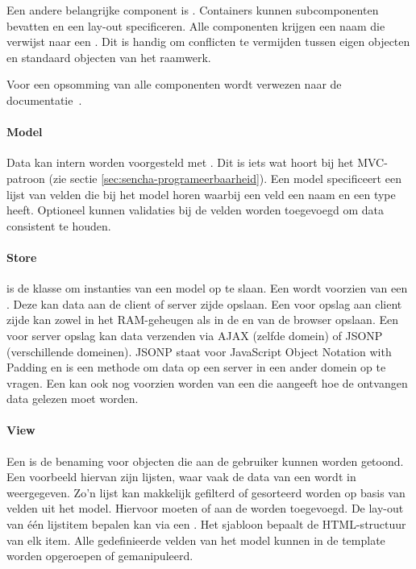Een andere belangrijke component is .  
Containers kunnen subcomponenten bevatten en een lay-out specificeren.  
Alle componenten krijgen een naam die verwijst naar een .  
Dit is handig om conflicten te vermijden tussen eigen objecten en standaard objecten van het raamwerk.  

Voor een opsomming van alle componenten wordt verwezen naar de documentatie~\cite{Inc.2013a}.

\paragraph{Model}
Data kan intern worden voorgesteld met .  
Dit is iets wat hoort bij het MVC-patroon (zie sectie \ref{sec:sencha-programeerbaarheid}).  
Een model specificeert een lijst van velden die bij het model horen waarbij een veld een naam en een type heeft.  
Optioneel kunnen validaties bij de velden worden toegevoegd om data consistent te houden.  

\paragraph{Store}
 is de klasse om instanties van een model op te slaan.  
Een  wordt voorzien van een .  
Deze kan data aan de client of server zijde opslaan.  
Een  voor opslag aan client zijde kan zowel in het RAM-geheugen als in de  en  van de browser opslaan.  
Een  voor server opslag kan data verzenden via AJAX (zelfde domein) of JSONP (verschillende domeinen).  
JSONP staat voor JavaScript Object Notation with Padding en is een methode om data op een server in een ander domein op te vragen.
Een  kan ook nog voorzien worden van een  die aangeeft hoe de ontvangen data gelezen moet worden.

\paragraph{View}
Een  is de benaming voor objecten die aan de gebruiker kunnen worden getoond.  
Een voorbeeld hiervan zijn lijsten,  waar vaak de data van een  wordt in weergegeven.  
Zo'n lijst kan makkelijk gefilterd of gesorteerd worden op basis van velden uit het model.
Hiervoor moeten  of  aan de  worden toegevoegd. 
De lay-out van één lijstitem bepalen kan via een .  
Het sjabloon bepaalt de HTML-structuur van elk item.  
Alle gedefinieerde velden van het model kunnen in de template worden opgeroepen of gemanipuleerd.

